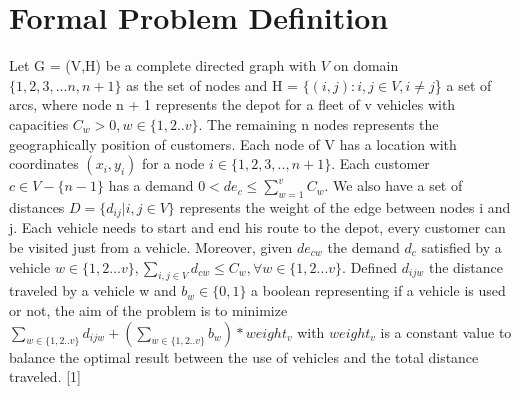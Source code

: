 \section{Formal Problem Definition}
Let G = (V,H) be a complete directed graph with \begin{math}V \end{math} on domain \begin{math} \{1,2,3,...n, n + 1\} \end{math} as the set of nodes and H = \begin{math}\{(i,j) : i,j \in V, i \neq j\end{math}\} a set of arcs, where node n + 1 represents the depot for a fleet of v vehicles with capacities \begin{math}C_{w} > 0, w \in \{1,2..v\} \end{math}. The remaining n nodes represents the geographically position of customers. Each node of V has a location with coordinates \begin{math}(x_{i}, y_{i}) \end{math} for a node \begin{math}i \in \{1,2,3,.., n + 1\}\end{math}. Each customer \begin{math} c \in V - \{n-1\}\end{math} has a demand \begin{math} 0 < de_{c} \leq \sum_{w = 1}^{v} C_{w}.\end{math} We also have a set of distances \begin{math} D = \{d_{ij} | i,j \in V\} \end{math} represents the weight of the edge between nodes i and j.
\newline \newline Each vehicle needs to start and end his route to the depot, every customer can be visited just from a vehicle. Moreover, given \begin{math}de_{cw}\end{math} the demand \begin{math} d_{c}\end{math} satisfied by a vehicle \begin{math}w \in \{1,2...v\},\sum_{i,j \in V }d_{cw} \leq C_{w}, \forall w \in \{1,2...v\}\end{math}. \newline \newline Defined \begin{math}d_{ijw}\end{math} the distance traveled by a vehicle w and \begin{math} b_{w} \in \{0,1\}\end{math} a boolean representing if a vehicle is used or not, the aim of the problem is to minimize \begin{math}\sum_{w \in \{1,2..v\}}d_{ijw} + (\sum_{w \in \{1,2..v\}}b_{w}) * weight_{v}\end{math} with \begin{math}weight_{v}\end{math} is a constant value to balance the optimal result between the use of vehicles and the total distance traveled. [1]\newline
